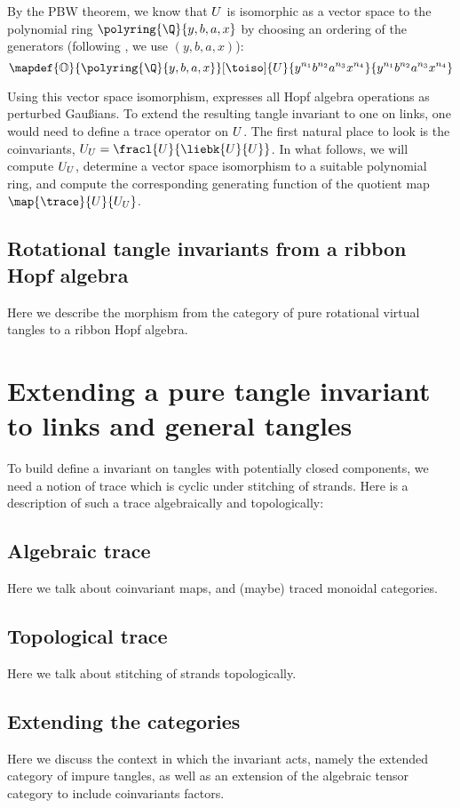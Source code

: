 \documentclass{article}
\begin{document}
By the PBW theorem, we know that $U$ is isomorphic as a vector space to the
polynomial ring $\polyring{\Q}{y, b, a, x}$ by choosing an ordering of the
generators (following \cite{BV}, we use $(y, b, a, x)$):
\begin{equation}
        \mapdef {\Order} {\polyring{\Q}{y, b, a, x}} [\toiso] {\CU}
        {y^{n_1}b^{n_2}a^{n_3}x^{n_4}} {y^{n_1}b^{n_2}a^{n_3}x^{n_4}}
\end{equation}

Using this vector space isomorphism, \cite{BV} expresses all Hopf algebra
operations as perturbed Gaußians. To extend the resulting tangle invariant to
one on links, one would need to define a trace operator on $U$. The first
natural place to look is the coinvariants,
$\CU_\CU = \fracl{\CU}{\liebk{\CU}{\CU}}$. In what follows, we will compute
$U_U$, determine a vector space isomorphism to a suitable polynomial ring,
and compute the corresponding generating function of the quotient map $\map
{\trace} {\CU} {\CU_\CU}$.

\subsection{Rotational tangle invariants from a ribbon Hopf algebra}
Here we describe the morphism from the category of pure rotational virtual
tangles to a ribbon Hopf algebra.

\section{Extending a pure tangle invariant to links and general tangles}
To build define a invariant on tangles with potentially closed components, we
need a notion of trace which is cyclic under stitching of strands. Here is a
description of such a trace algebraically and topologically:

\subsection{Algebraic trace}
Here we talk about coinvariant maps, and (maybe) traced monoidal categories.

\subsection{Topological trace}
Here we talk about stitching of strands topologically.

\subsection{Extending the categories}
Here we discuss the context in which the invariant acts, namely the extended
category of impure tangles, as well as an extension of the algebraic tensor
category to include coinvariants factors.
\end{document}
